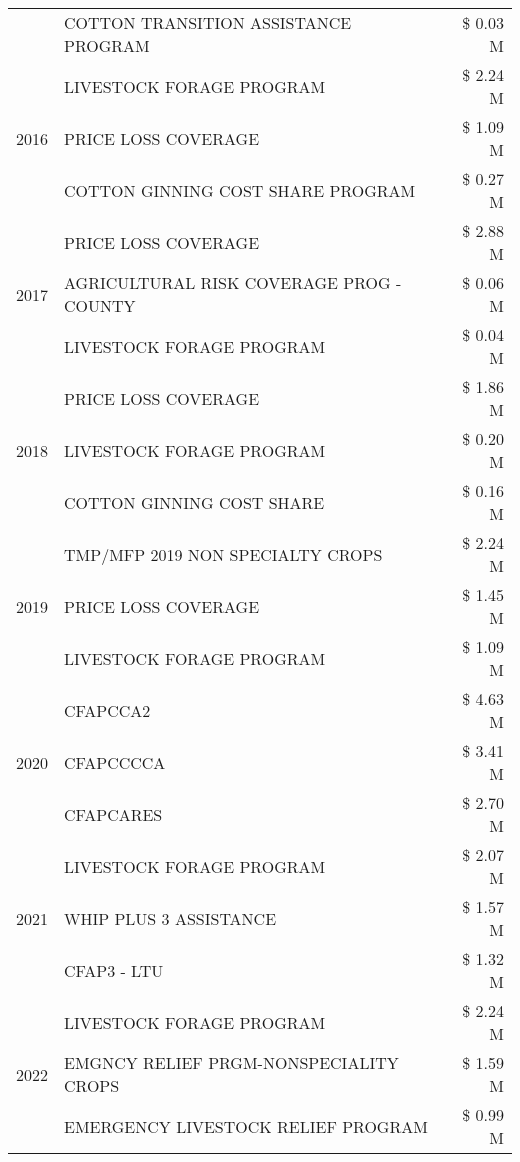 \begin{tabular}{llr}
 & COTTON TRANSITION ASSISTANCE PROGRAM & \$ 0.03 M \\
\cline{1-3}
\multirow[t]{3}{*}{2016} & LIVESTOCK FORAGE PROGRAM & \$ 2.24 M \\
 & PRICE LOSS COVERAGE & \$ 1.09 M \\
 & COTTON GINNING COST SHARE PROGRAM & \$ 0.27 M \\
\cline{1-3}
\multirow[t]{3}{*}{2017} & PRICE LOSS COVERAGE & \$ 2.88 M \\
 & AGRICULTURAL RISK COVERAGE PROG - COUNTY & \$ 0.06 M \\
 & LIVESTOCK FORAGE PROGRAM & \$ 0.04 M \\
\cline{1-3}
\multirow[t]{3}{*}{2018} & PRICE LOSS COVERAGE & \$ 1.86 M \\
 & LIVESTOCK FORAGE PROGRAM & \$ 0.20 M \\
 & COTTON GINNING COST SHARE & \$ 0.16 M \\
\cline{1-3}
\multirow[t]{3}{*}{2019} & TMP/MFP 2019 NON SPECIALTY CROPS & \$ 2.24 M \\
 & PRICE LOSS COVERAGE & \$ 1.45 M \\
 & LIVESTOCK FORAGE PROGRAM & \$ 1.09 M \\
\cline{1-3}
\multirow[t]{3}{*}{2020} & CFAPCCA2 & \$ 4.63 M \\
 & CFAPCCCCA & \$ 3.41 M \\
 & CFAPCARES & \$ 2.70 M \\
\cline{1-3}
\multirow[t]{3}{*}{2021} & LIVESTOCK FORAGE PROGRAM & \$ 2.07 M \\
 & WHIP PLUS 3 ASSISTANCE & \$ 1.57 M \\
 & CFAP3 - LTU & \$ 1.32 M \\
\cline{1-3}
\multirow[t]{3}{*}{2022} & LIVESTOCK FORAGE PROGRAM & \$ 2.24 M \\
 & EMGNCY RELIEF PRGM-NONSPECIALITY CROPS & \$ 1.59 M \\
 & EMERGENCY LIVESTOCK RELIEF PROGRAM & \$ 0.99 M \\
\cline{1-3}
\bottomrule
\end{tabular}
